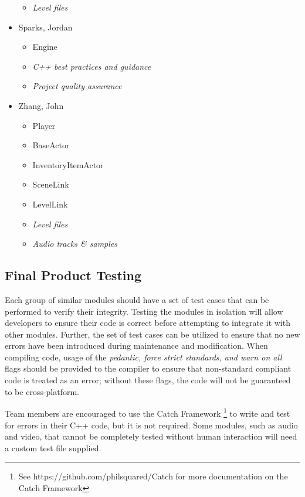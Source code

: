 \documentclass{article}
\begin{document}
\begin{multicols}{2}
\begin{itemize}
\begin{itemize}
				\item \emph{Level files}
			\end{itemize}
        \item Sparks, Jordan 
        	\begin{itemize}
				\item Engine
				\item \emph{C++ best practices and guidance} 
				\item \emph{Project quality assurance}
			\end{itemize}
        \item Zhang, John 
        	\begin{itemize}
				\item Player
				\item BaseActor
				\item InventoryItemActor
				\item SceneLink
				\item LevelLink
				\item \emph{Level files}
				\item \emph{Audio tracks \& samples}
			\end{itemize}
      \end{itemize}
      \end{multicols}
      
	\subsection{Final Product Testing}
    Each group of similar modules should have a set of test cases that can be performed to verify their integrity. Testing the modules in isolation will allow developers to ensure their code is correct before attempting to integrate it with other modules. Further, the set of test cases can be utilized to ensure that no new errors have been introduced during maintenance and modification. When compiling code, usage of the \textit{pedantic, force strict standards, and warn on all} flags should be provided to the compiler to ensure that non-standard compliant code is treated as an error; without these flags, the code will not be guaranteed to be cross-platform.

    Team members are encouraged to use the Catch Framework \footnote{See https://github.com/philsquared/Catch for more documentation on the Catch Framework} to write and test for errors in their C++ code, but it is not required. Some modules, such as audio and video, that cannot be completely tested without human interaction will need a custom test file supplied.
\end{document}
